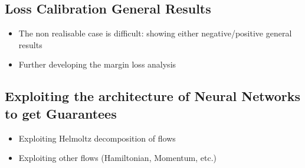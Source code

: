 \subsection{Loss Calibration General Results}

\begin{itemize}
    \item The non realisable case is difficult: showing either negative/positive general results
    \item Further developing the margin loss analysis
\end{itemize}
\subsection{Exploiting the architecture of Neural Networks to get Guarantees}
\begin{itemize}
    \item Exploiting Helmoltz decomposition of flows
    \item Exploiting other flows (Hamiltonian, Momentum, etc.)
\end{itemize}








